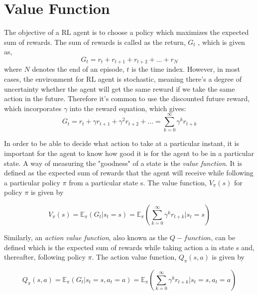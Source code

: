     \section{Value Function}
        The objective of a RL agent is to choose a policy which maximizes the expected sum of rewards. The sum of rewards is called as the return, $G_t$ , which is given as,
        \begin{equation*}
            G_t=r_t+r_{t+1}+r_{t+2}+...+r_{N}
        \end{equation*}
        where $N$ denotes the end of an episode, $t$ is the time index.
        However, in most cases, the environment for RL agent is stochastic, meaning there's a degree of uncertainty whether the agent will get the same reward if we take the same action in the future. Therefore it's common to use the discounted future reward, which incorporates $\gamma$ into the reward equation, which gives:
        \begin{equation*}
            G_t=r_t+\gamma r_{t+1}+\gamma^2 r_{t+2}+...=\sum_{k=0}^{\infty}\gamma^k r_{t+k}
        \end{equation*}
        \par
        In order to be able to decide what action to take at a particular instant, it is important for the agent to know how good it is for the agent to be in a particular state. A way of measuring the "goodness" of a state is the \textit{value function}. It is defined as the expected sum of rewards that the agent will receive while following a particular policy $\pi$ from a particular state s. The value function, $V_\pi(s)$ for policy $\pi$ is given by
        
        \begin{equation*}
            V_\pi (s)=\mathbb{E}_\pi (G_t|s_t=s) = \mathbb{E}_\pi (\sum_{k=0}^{\infty}\gamma^k r_{t+k } | s_t=s )
        \end{equation*}
        
        Similarly, an \textit{action value function}, also known as the $Q-function$, can be defined which is the expected sum of rewards while taking action a in state s and, thereafter, following policy $\pi$. The action value function, $Q_\pi (s, a)$ is given by
        
        \begin{equation} \label{eq:21}
            Q_\pi (s,a)=\mathbb{E}_\pi (G_t|s_t=s,a_t=a) = \mathbb{E}_\pi (\sum_{k=0}^{\infty}\gamma^k r_{t+k } | s_t=s,a_t=a )
        \end{equation}
        
